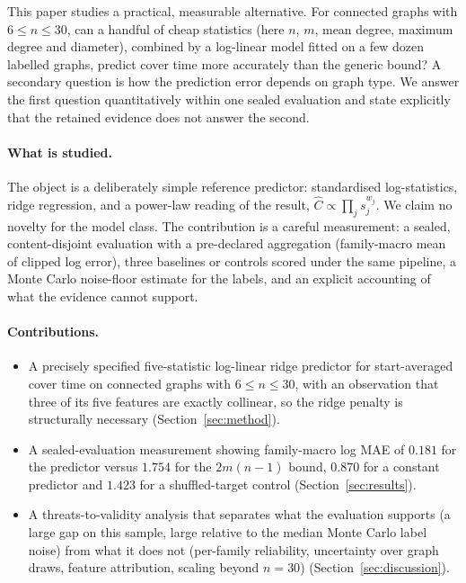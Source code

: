 \documentclass{article}
\begin{document}
This paper studies a practical, measurable alternative. For connected graphs with $6\le n\le 30$, can a handful of cheap statistics (here $n$, $m$, mean degree, maximum degree and diameter), combined by a log-linear model fitted on a few dozen labelled graphs, predict cover time more accurately than the generic bound? A secondary question is how the prediction error depends on graph type. We answer the first question quantitatively within one sealed evaluation and state explicitly that the retained evidence does not answer the second.

\paragraph{What is studied.} The object is a deliberately simple reference predictor: standardised log-statistics, ridge regression, and a power-law reading of the result, $\widehat{C}\propto \prod_j s_j^{w_j}$. We claim no novelty for the model class. The contribution is a careful measurement: a sealed, content-disjoint evaluation with a pre-declared aggregation (family-macro mean of clipped log error), three baselines or controls scored under the same pipeline, a Monte Carlo noise-floor estimate for the labels, and an explicit accounting of what the evidence cannot support.

\paragraph{Contributions.}
\begin{itemize}
\item A precisely specified five-statistic log-linear ridge predictor for start-averaged cover time on connected graphs with $6\le n\le 30$, with an observation that three of its five features are exactly collinear, so the ridge penalty is structurally necessary (Section~\ref{sec:method}).
\item A sealed-evaluation measurement showing family-macro log MAE of $0.181$ for the predictor versus $1.754$ for the $2m(n-1)$ bound, $0.870$ for a constant predictor and $1.423$ for a shuffled-target control (Section~\ref{sec:results}).
\item A threats-to-validity analysis that separates what the evaluation supports (a large gap on this sample, large relative to the median Monte Carlo label noise) from what it does not (per-family reliability, uncertainty over graph draws, feature attribution, scaling beyond $n=30$) (Section~\ref{sec:discussion}).
\end{itemize}
\end{document}
